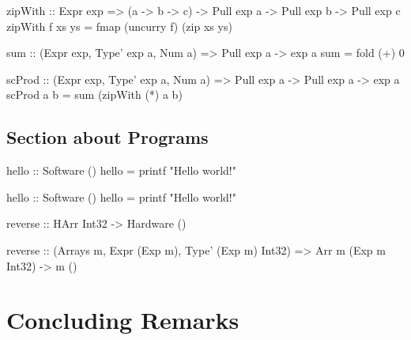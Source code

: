 \lipsum[1]

\begin{code}
zipWith :: Expr exp => (a -> b -> c) -> Pull exp a -> Pull exp b -> Pull exp c
zipWith f xs ys = fmap (uncurry f) (zip xs ys)

sum :: (Expr exp, Type' exp a, Num a) => Pull exp a -> exp a
sum = fold (+) 0
\end{code}

\lipsum[1]

\begin{code}
scProd :: (Expr exp, Type' exp a, Num a) => Pull exp a -> Pull exp a -> exp a
scProd a b = sum (zipWith (*) a b)
\end{code}

\section{Section about Programs}

\lipsum[1]

\begin{code}
hello :: Software ()
hello = printf "Hello world!\n"
\end{code}

\lipsum[2]

\begin{code}
hello :: Software ()
hello = printf "Hello world!\n"
\end{code}

\lipsum[3]


\lipsum[4]

\begin{stub}
reverse :: HArr Int32 -> Hardware ()
\end{stub}

\lipsum[5]

\begin{stub}
reverse :: (Arrays m, Expr (Exp m), Type' (Exp m) Int32) =>
  Arr m (Exp m Int32) -> m ()
\end{stub}

\lipsum[6]

%
%

\chapter{Concluding Remarks}
\label{ch:conc}

\lipsum
